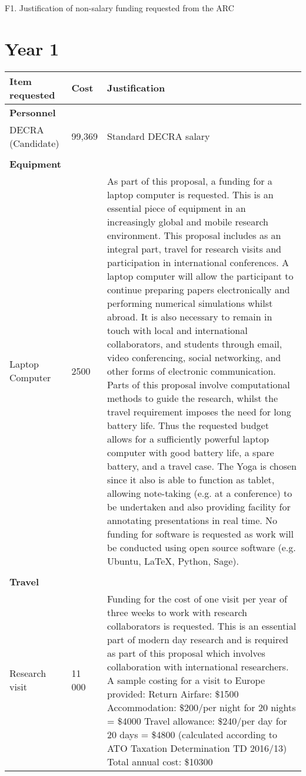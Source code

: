 \documentclass{amsart}
\begin{document}
\begingroup  
  \centering
  \large F1. Justification of non-salary funding requested from the ARC
\endgroup

\section*{Year 1}
\label{sec:orgheadline1}
\begin{center}
\begin{tabular}{|l|l|p{10cm}|}
\hline
\textbf{Item requested} & \textbf{Cost} & \textbf{Justification}\\
\hline
\textbf{Personnel} &  & \\
DECRA (Candidate) & 99,369 & Standard DECRA salary\\
 &  & \\
\textbf{Equipment} &  & \\
Laptop Computer & 2500 & As part of this proposal, a funding for a laptop computer is requested. This is an essential piece of equipment in an increasingly global and mobile research environment. This proposal includes as an integral part, travel for research visits and participation in international conferences. A laptop computer will allow the participant to continue preparing papers electronically and performing numerical simulations whilst abroad. It is also necessary to remain in touch with local and international collaborators, and students through email, video conferencing, social networking, and other forms of electronic communication. Parts of this proposal involve computational methods to guide the research, whilst the travel requirement imposes the need for long battery life. Thus the requested budget allows for a sufficiently powerful laptop computer with good battery life, a spare battery, and a travel case. The Yoga is chosen since it also is able to function as tablet, allowing note-taking (e.g. at a conference) to be undertaken and also providing facility for annotating presentations in real time. No funding for software is requested as work will be conducted using open source software (e.g. Ubuntu, \LaTeX{}, Python, Sage).\\
 &  & \\
\textbf{Travel} &  & \\
Research visit & 11 000 & Funding for the cost of one visit per year of three weeks to work with research collaborators is requested. This is an essential part of modern day research and is required as part of this proposal which involves collaboration with international researchers. A sample costing for a visit to Europe provided: Return Airfare: \$1500  Accommodation: \$200/per night for 20 nights = \$4000  Travel allowance: \$240/per day for 20 days = \$4800 (calculated according to ATO Taxation Determination TD 2016/13)  Total annual cost: \$10300\\

\end{tabular}
\end{center}
\end{document}
